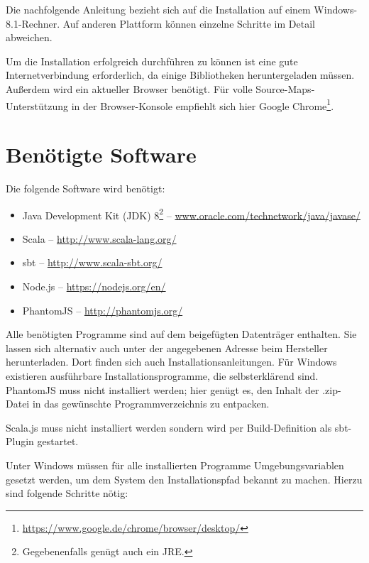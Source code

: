 \documentclass[a4paper, 12pt, hidelinks, listof=totoc, listoftables=totoc, bibliography=totoc]{scrreprt}
\begin{document}
Die nachfolgende Anleitung bezieht sich auf die Installation auf einem Windows-8.1-Rechner. Auf anderen Plattform können einzelne Schritte im Detail abweichen.

Um die Installation erfolgreich durchführen zu können ist eine gute Internetverbindung erforderlich, da einige Bibliotheken heruntergeladen müssen. Außerdem wird ein aktueller Browser benötigt. Für volle Source-Maps-Unterstützung in der Browser-Konsole empfiehlt sich hier Google Chrome\footnote{\url{https://www.google.de/chrome/browser/desktop/}}.

\section{Benötigte Software}

Die folgende Software wird benötigt:

\begin{itemize}
	\item Java Development Kit (JDK) 8\footnote{Gegebenenfalls genügt auch ein JRE.}  --  \url{www.oracle.com/technetwork/java/javase/}
	\item Scala  --  \url{http://www.scala-lang.org/}
	\item sbt  --  \url{http://www.scala-sbt.org/}
	\item Node.js  --  \url{https://nodejs.org/en/}
	\item PhantomJS  --  \url{http://phantomjs.org/}
\end{itemize}

Alle benötigten Programme sind auf dem beigefügten Datenträger enthalten. Sie lassen sich alternativ auch unter der angegebenen Adresse beim Hersteller herunterladen. Dort finden sich auch Installationsanleitungen. Für Windows existieren ausführbare Installationsprogramme, die selbsterklärend sind. PhantomJS muss nicht installiert werden; hier genügt es, den Inhalt der .zip-Datei in das gewünschte Programmverzeichnis zu entpacken.

Scala.js muss nicht installiert werden sondern wird per Build-Definition als sbt-Plugin gestartet.

Unter Windows müssen für alle installierten Programme Umgebungsvariablen gesetzt werden, um dem System den Installationspfad bekannt zu machen. Hierzu sind folgende Schritte nötig:
\end{document}
